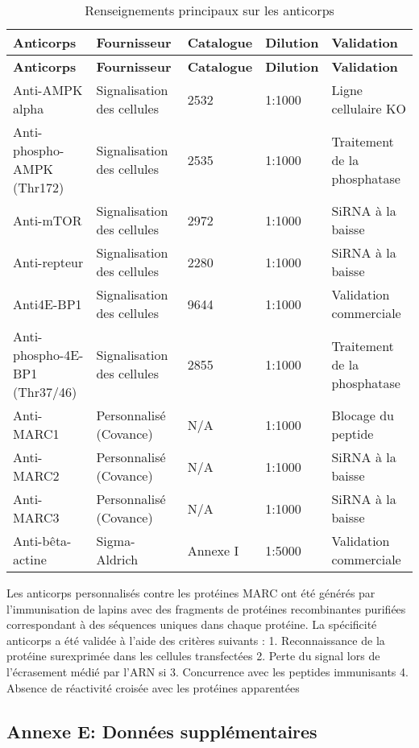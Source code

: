 \documentclass[11pt,a4paper]{article}
\begin{document}
\begin{longtable}{|p{}|p{2cm}|p{2cm}|p{2cm}|p{3cm}|}
\caption{Renseignements principaux sur les anticorps} \\
\hline
\textbf{Anticorps} & \textbf{Fournisseur} & \textbf{Catalogue} & \textbf{Dilution} & \textbf{Validation} \\
\hline
\endfirsthead
\hline
\textbf{Anticorps} & \textbf{Fournisseur} & \textbf{Catalogue} & \textbf{Dilution} & \textbf{Validation} \\
\hline
\endhead
Anti-AMPK alpha & Signalisation des cellules & 2532 & 1:1000 & Ligne cellulaire KO \\
Anti-phospho-AMPK (Thr172) & Signalisation des cellules & 2535 & 1:1000 & Traitement de la phosphatase \\
Anti-mTOR & Signalisation des cellules & 2972 & 1:1000 & SiRNA à la baisse \\
Anti-repteur & Signalisation des cellules & 2280 & 1:1000 & SiRNA à la baisse \\
Anti4E-BP1 & Signalisation des cellules & 9644 & 1:1000 & Validation commerciale \\
Anti-phospho-4E-BP1 (Thr37/46) & Signalisation des cellules & 2855 & 1:1000 & Traitement de la phosphatase \\
Anti-MARC1 & Personnalisé (Covance) & N/A & 1:1000 & Blocage du peptide \\
Anti-MARC2 & Personnalisé (Covance) & N/A & 1:1000 & SiRNA à la baisse \\
Anti-MARC3 & Personnalisé (Covance) & N/A & 1:1000 & SiRNA à la baisse \\
Anti-bêta-actine & Sigma-Aldrich & Annexe I & 1:5000 & Validation commerciale \\
\hline
\end{longtable}

Les anticorps personnalisés contre les protéines MARC ont été générés par l'immunisation de lapins avec des fragments de protéines recombinantes purifiées correspondant à des séquences uniques dans chaque protéine. La spécificité anticorps a été validée à l'aide des critères suivants : 1. Reconnaissance de la protéine surexprimée dans les cellules transfectées 2. Perte du signal lors de l'écrasement médié par l'ARN si 3. Concurrence avec les peptides immunisants 4. Absence de réactivité croisée avec les protéines apparentées

\subsection*{Annexe E: Données supplémentaires}
\end{document}
